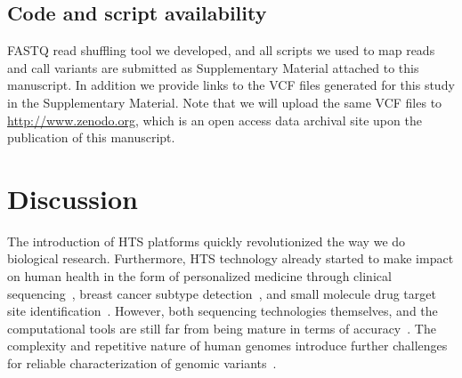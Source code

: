 \documentclass{bioinfo}
\begin{document}
\begin{methods}
\subsection*{Code and script availability} FASTQ read shuffling tool we developed, and all scripts we used to map reads and call variants
 are submitted as Supplementary Material attached to this manuscript. In addition we provide links to the VCF files generated for this study in the Supplementary Material. Note that we will upload the same VCF files to \url{http://www.zenodo.org}, which is an open access data archival site upon the publication of this manuscript.

\section{Discussion}

The introduction of HTS platforms  quickly revolutionized the way we do biological research\citep{Mardis2008,Metzker2010}. Furthermore, HTS technology  already started to make impact on human health in the form of personalized medicine
through clinical sequencing~\citep{Biesecker2009}, breast cancer subtype detection~\citep{Bosdet2013}, and small molecule drug target site identification~\citep{Rodriguez2014}. However, both sequencing technologies themselves,%
 and the computational tools are still far from being mature in terms of accuracy~\citep{Alkan2011,Nielsen2011}. The complexity and repetitive nature of human genomes introduce further challenges for reliable characterization of genomic variants~\citep{Treangen2012}.


\end{methods}
\end{document}
